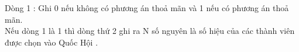 Dòng 1 : Ghi 0 nếu không có phương án thoả mãn và 1 nếu có phương án thoả mãn.   
\\   Nếu dòng 1 là 1 thì dòng thứ 2 ghi ra N số nguyên là số hiệu của các thành viên được chọn vào Quốc Hội .